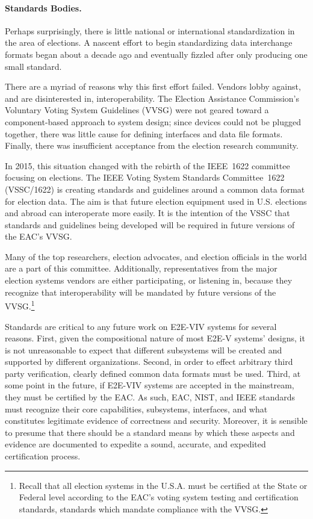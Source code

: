 \paragraph{Standards Bodies.} Perhaps surprisingly, there is little
national or international standardization in the area of elections. A
nascent effort to begin standardizing data interchange formats began
about a decade ago and eventually fizzled after only producing one
small standard.

There are a myriad of reasons why this first effort failed. Vendors
lobby against, and are disinterested in, interoperability. The
Election Assistance Commission's Voluntary Voting System Guidelines
(VVSG) were not geared toward a component-based approach to system
design; since devices could not be plugged together, there was little 
cause for defining interfaces and data file formats. Finally, there
was insufficient acceptance from the election research community.

In 2015, this situation changed with the rebirth of the IEEE~1622
committee focusing on elections. The IEEE Voting System Standards
Committee~1622 (VSSC/1622) is creating standards and guidelines around
a common data format for election data. The aim is that future
election equipment used in U.S. elections and abroad can interoperate
more easily. It is the intention of the VSSC that standards and
guidelines being developed will be required in future versions of the
EAC's VVSG.

Many of the top researchers, election advocates, and election
officials in the world are a part of this committee. Additionally,
representatives from the major election systems vendors are either
participating, or listening in, because they recognize that
interoperability will be mandated by future versions of the
VVSG.\footnote{Recall that all election systems in the U.S.A. must be
  certified at the State or Federal level according to the EAC's
  voting system testing and certification standards, standards which
  mandate compliance with the VVSG.}

Standards are critical to any future work on E2E-VIV systems for
several reasons. First, given the compositional nature of most E2E-V
systems' designs, it is not unreasonable to expect that different
subsystems will be created and supported by different organizations.
Second, in order to effect arbitrary third party verification, clearly
defined common data formats must be used. Third, at some point in the
future, if E2E-VIV systems are accepted in the mainstream, they must
be certified by the EAC. As such, EAC, NIST, and IEEE standards must
recognize their core capabilities, subsystems, interfaces, and what
constitutes legitimate evidence of correctness and security. Moreover,
it is sensible to presume that there should be a standard means by
which these aspects and evidence are documented to expedite a sound,
accurate, and expedited certification process.

